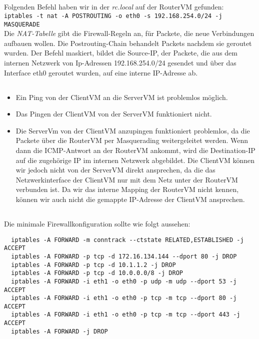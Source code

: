 \documentclass{scrartcl}
\begin{document}
  \subsection{}
  \label{sub:3.1}
  Folgenden Befehl haben wir in der \textit{rc.local} auf der RouterVM gefunden:\\
  \texttt{iptables -t nat -A POSTROUTING -o eth0 -s 192.168.254.0/24 -j MASQUERADE}\\
  Die \textit{NAT-Tabelle} gibt die Firewall-Regeln an, für Packete, die neue
  Verbindungen aufbauen wollen. Die Postrouting-Chain behandelt Packets nachdem
  sie geroutet wurden. Der Befehl maskiert, bildet die Source-IP, der Packete,
  die aus dem internen Netzwerk von Ip-Adressen 192.168.254.0/24 gesendet und
  über das Interface eth0 geroutet wurden, auf eine interne IP-Adresse ab.

  \subsection{}
  \label{sub:3.2}
  \begin{itemize}
    \item Ein Ping von der ClientVM an die ServerVM ist problemlos möglich.
    \item Das Pingen der ClientVM von der ServerVM  funktioniert nicht.
    \item
    Die ServerVm von der ClientVM anzupingen funktioniert problemlos,
    da die Packete über die RouterVM per Masquerading weitergeleitet werden.
    Wenn dann die ICMP-Antwort an der RouterVM ankommt, wird die Destination-IP
    auf die zugehörige IP im internen Netzwerk abgebildet.
    Die ClientVM können wir jedoch nicht von der ServerVM direkt ansprechen, da
    die das Netzwerkinterface der ClientVM nur mit dem Netz unter der RouterVM
    verbunden ist. Da wir das interne Mapping der RouterVM nicht kennen, können
    wir auch nicht die gemappte IP-Adresse der ClientVM ansprechen.
  \end{itemize}

\subsection{}
\label{sub:3.3}
Die minimale Firewallkonfiguration sollte wie folgt aussehen:
\begin{lstlisting}
  iptables -A FORWARD -m conntrack --ctstate RELATED,ESTABLISHED -j ACCEPT
  iptables -A FORWARD -p tcp -d 172.16.134.144 --dport 80 -j DROP
  iptables -A FORWARD -p tcp -d 10.1.1.2 -j DROP
  iptables -A FORWARD -p tcp -d 10.0.0.0/8 -j DROP
  iptables -A FORWARD -i eth1 -o eth0 -p udp -m udp --dport 53 -j ACCEPT
  iptables -A FORWARD -i eth1 -o eth0 -p tcp -m tcp --dport 80 -j ACCEPT
  iptables -A FORWARD -i eth1 -o eth0 -p tcp -m tcp --dport 443 -j ACCEPT
  iptables -A FORWARD -j DROP
\end{lstlisting}
\end{document}

